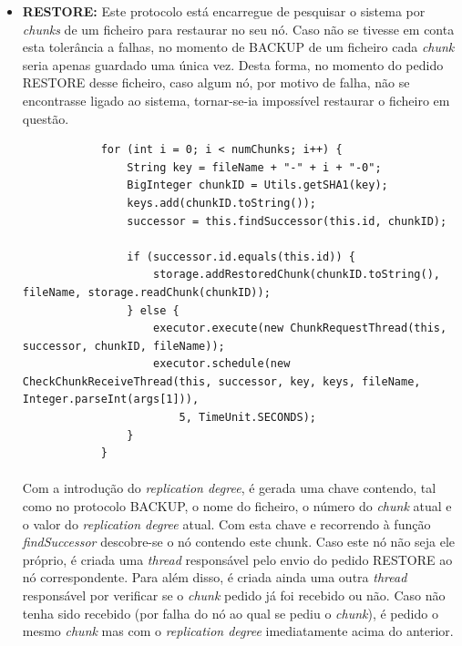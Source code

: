\documentclass[11pt,oneside]{book}
\begin{document}
\begin{itemize}
            \pagebreak

            \item \textbf{RESTORE:} Este protocolo está encarregue de pesquisar o sistema por 
            \textit{chunks} de um ficheiro para restaurar no seu nó. Caso não se tivesse em conta
            esta tolerância a falhas, no momento de BACKUP de um ficheiro cada \textit{chunk} seria 
            apenas guardado uma única vez. Desta forma, no momento do pedido RESTORE desse ficheiro,
            caso algum nó, por motivo de falha, não se encontrasse ligado ao sistema, tornar-se-ia 
            impossível restaurar o ficheiro em questão.
        
        \begin{lstlisting}
            for (int i = 0; i < numChunks; i++) {
                String key = fileName + "-" + i + "-0";
                BigInteger chunkID = Utils.getSHA1(key);
                keys.add(chunkID.toString());
                successor = this.findSuccessor(this.id, chunkID);

                if (successor.id.equals(this.id)) {
                    storage.addRestoredChunk(chunkID.toString(), fileName, storage.readChunk(chunkID));
                } else {
                    executor.execute(new ChunkRequestThread(this, successor, chunkID, fileName));
                    executor.schedule(new CheckChunkReceiveThread(this, successor, key, keys, fileName, Integer.parseInt(args[1])),
                        5, TimeUnit.SECONDS);
                }
            }
        \end{lstlisting}
        
        \paragraph{}
            Com a introdução do \textit{replication degree}, é gerada uma chave contendo, tal como 
            no protocolo BACKUP, o nome  do ficheiro, o número do \textit{chunk} atual e o valor 
            do \textit{replication degree} atual. Com esta chave e recorrendo à função
            \textit{findSuccessor} descobre-se o nó contendo este chunk. Caso este nó não seja 
            ele próprio, é criada uma \textit{thread} responsável pelo envio do pedido RESTORE 
            ao nó correspondente. Para além disso, é criada ainda uma outra \textit{thread} 
            responsável por verificar se o \textit{chunk} pedido já foi recebido ou não. Caso 
            não tenha sido recebido (por falha do nó ao qual se pediu o \textit{chunk}), é pedido
            o mesmo \textit{chunk} mas com o \textit{replication degree} imediatamente acima do 
            anterior.


\end{itemize}
\end{document}
